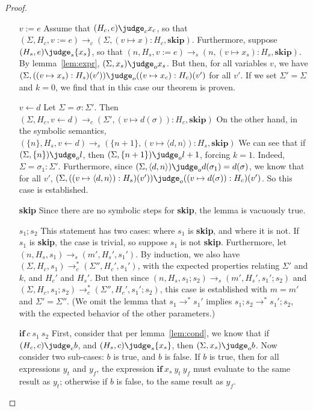 \begin{proof}
  \begin{itemize}
  \item[$v := e$] Assume that $(H_c, e) \judge_c x_c$, so that
    $(\Sigma, H_c, v := e) \to_c (\Sigma, (v \mapsto x):H_c, \mathbf{skip})$.
    Furthermore, suppose $(H_s, e) \judge_s \{ x_s \}$, so that
    $(n, H_s, v := e) \to_s (n, (v \mapsto x_s):H_s, \mathbf{skip})$.
    By lemma~\ref{lem:expr}, $(\Sigma, x_s) \judge_o x_s$.  But then,
    for all variables $v$, we have
    $(\Sigma, ((v \mapsto x_s):H_s)(v')) \judge_o ((v \mapsto x_c):H_c)(v')$
    for all $v'$.  If we set $\Sigma' = \Sigma$ and $k = 0$, we find
    that in this case our theorem is proven.
  \item[$v \leftarrow d$] Let $\Sigma = \sigma:\Sigma'$.  Then
    $(\Sigma, H_c, v \leftarrow d) \to_c (\Sigma', (v \mapsto d(\sigma)):H_c, \mathbf{skip})$
    On the other hand, in the symbolic semantics,
    $(\{ n \}, H_s, v \leftarrow d) \to_s (\{ n+1 \}, (v \mapsto \langle d, n \rangle):H_s, \mathbf{skip})$
    We can see that
    if $(\Sigma, \{ n \}) \judge_o l$, then $(\Sigma, \{n + 1\}) \judge_o l + 1$,
    forcing $k = 1$. Indeed, $\Sigma = \sigma_1:\Sigma'$.  Furthermore, since
    $(\Sigma, \langle d, n \rangle) \judge_o d(\sigma_1) = d(\sigma)$,
    we know that for all $v'$,
    $(\Sigma, ((v \mapsto \langle d, n \rangle):H_s)(v')) \judge_o ((v \mapsto d(\sigma)):H_c)(v')$.
    So this case is established.
  \item[\textbf{skip}] Since there are no symbolic steps
    for \textbf{skip}, the lemma is vacuously true.
  \item[$s_1 ; s_2$] This statement has two cases: where $s_1$ is
    \textbf{skip}, and where it is not.  If $s_1$ is \textbf{skip},
    the case is trivial, so suppose $s_1$ is not \textbf{skip}.
    Furthermore, let $(n, H_s, s_1) \to_s (m', H_s', s_1')$.
    By induction, we also have
    $(\Sigma, H_c, s_1) \to_c^{*} (\Sigma'', H_c', s_1')$,
    with the expected properties relating $\Sigma'$ and $k$, and
    $H_c'$ and $H_s'$.  But then since
    $(n, H_s, s_1 ; s_2) \to_s (m', H_s', s_1' ; s_2)$
    and
    $(\Sigma, H_c, s_1 ; s_2) \to_c^{*} (\Sigma'', H_c', s_1' ; s_2)$,
    this case is established with $m = m'$ and $\Sigma' = \Sigma''$.
    (We omit the lemma that
    $s_1 \to^{*} s_1'$ implies $s_1 ; s_2 \to^{*} s_1' ; s_2$,
    with the expected behavior of the other parameters.)
  \item[$\mathbf{if}\:c\:s_1\:s_2$]
    First, consider that per lemma~\ref{lem:cond},
      we know that if $(H_c, c) \judge_c b$,
      and $(H_s, c) \judge_s \{ x_s \}$,
      then $(\Sigma, x_s) \judge_o b$.
    Now consider two sub-cases:
      $b$ is true, and $b$ is false.
    If $b$ is true,
      then for all expressions $y_t$ and $y_f$,
      the expression $\mathbf{if}\:x_s\:y_t\:y_f$
      must evaluate to the same result as $y_t$;
      otherwise if $b$ is false,
      to the same result as $y_f$.


\end{itemize}
\end{proof}
